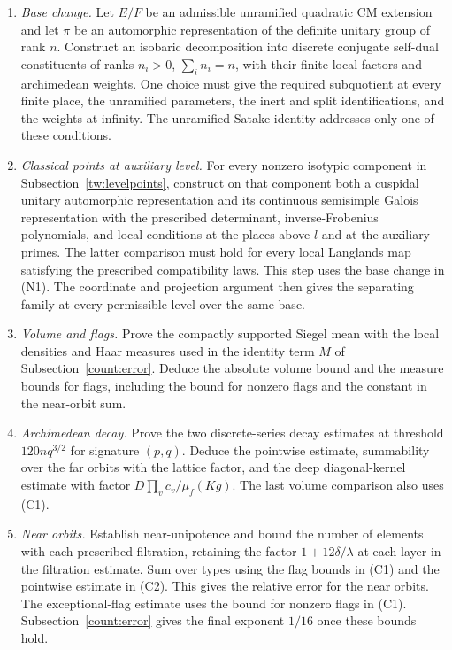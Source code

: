 \begin{enumerate}[labelwidth=2.4em,leftmargin=3em,itemsep=5pt]
\item[\textup{(N1)}] \emph{Base change.} Let $E/F$ be an admissible unramified quadratic
CM extension and let $\pi$ be an automorphic representation of the
definite unitary group of rank $n$. Construct an isobaric decomposition
into discrete conjugate self-dual constituents of ranks $n_i>0$, $\sum_i n_i=n$, with their finite local factors and archimedean weights.
One choice must give the required subquotient at every finite place,
the unramified parameters, the inert and split identifications, and the
weights at infinity. The unramified Satake identity addresses only one
of these conditions.

\item[\textup{(N2)}] \emph{Classical points at auxiliary level.} For every nonzero
isotypic component in Subsection~\ref{tw:levelpoints}, construct on that
component both a cuspidal unitary automorphic representation and its continuous semisimple Galois representation with the prescribed
determinant, inverse-Frobenius polynomials, and local conditions at the
places above $l$ and at the auxiliary primes. The latter comparison must
hold for every local Langlands map satisfying the prescribed compatibility laws. This step
uses the base change in (N1). The coordinate and projection argument
then gives the separating family at every permissible level over the
same base.

\item[\textup{(C1)}] \emph{Volume and flags.} Prove the compactly supported Siegel mean
with the local densities and Haar measures used in the identity term
$M$ of Subsection~\ref{count:error}. Deduce the absolute volume bound
and the measure bounds for flags, including the bound for nonzero flags
and the constant in the near-orbit sum.

\item[\textup{(C2)}] \emph{Archimedean decay.} Prove the two discrete-series decay
estimates at threshold $120nq^{3/2}$ for signature $(p,q)$. Deduce the
pointwise estimate, summability over the far orbits with the lattice
factor, and the deep diagonal-kernel estimate with factor
$D\prod_v c_v/\mu_f(Kg)$. The last volume comparison also uses (C1).

\item[\textup{(C3)}] \emph{Near orbits.} Establish near-unipotence and bound the number
of elements with each prescribed filtration, retaining the factor
$1+12\delta/\lambda$ at each layer in the filtration estimate. Sum over
types using the flag bounds in (C1) and the pointwise estimate in
(C2). This gives the relative error for the near orbits. The exceptional-flag estimate uses the bound for nonzero flags in (C1). Subsection~\ref{count:error}
gives the final exponent $1/16$ once these bounds hold.


\end{enumerate}

